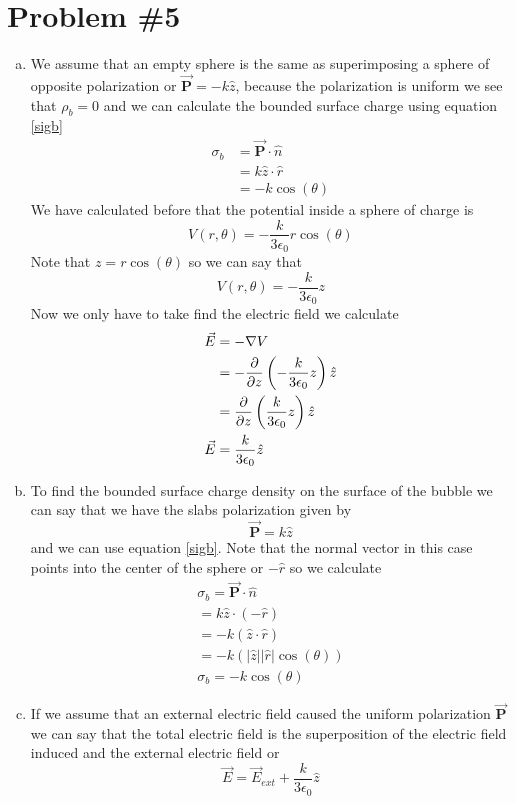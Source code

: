 \documentclass[11pt]{article}
\numberwithin{equation}{section}
\newcommand{\grad}{\bold\nabla}
\newcommand{\vecE}{\vec{E}}
\newcommand{\vecP}{\vec{\mathbf{P}}}
\begin{document}
\section{Problem \#5}
\begin{enumerate}[(a)]
\item
We assume that an empty sphere is the same as superimposing a sphere of opposite polarization or $\vecP = -k\hat{z}$, because the polarization is uniform we see that $\rho_b = 0$ and we can calculate the bounded surface charge using equation \ref{sigb}
\begin{align*}
\sigma_b &= \vecP \cdot\hat{n}\\
&=k\hat{z}\cdot\hat{r}\\
&=-k\cos(\theta)
\end{align*}
We have calculated before that the potential inside a sphere of charge is
$$V(r,\theta) = -\frac{k}{3\epsilon_0}r\cos(\theta)$$
Note that $z=r\cos(\theta)$ so we can say that
$$V(r,\theta) = -\frac{k}{3\epsilon_0}z$$
Now we only have to take find the electric field we calculate
\begin{align*}
\vecE &= -\grad V\\
&= -\frac{\partial}{\partial z}\left(-\frac{k}{3\epsilon_0}z\right)\hat{z} \\
&= \frac{\partial}{\partial z}\left(\frac{k}{3\epsilon_0}z\right)\hat{z} \\
\vecE &= \frac{k}{3\epsilon_0}\hat{z} 
\end{align*}

\item
To find the bounded surface charge density on the surface of the bubble we can say that we have the slabs polarization given by
$$\vecP = k\hat{z}$$
and we can use equation \ref{sigb}. Note that the normal vector in this case points into the center of the sphere or $-\hat{r}$ so we calculate
\begin{align*}
\sigma_b = \vecP\cdot\hat{n}\\
= k\hat{z}\cdot(-\hat{r})\\
= -k(\hat{z}\cdot\hat{r})\\
= -k(|\hat{z}||\hat{r}|\cos(\theta))\\
\sigma_b = -k\cos(\theta)
\end{align*}

\item
If we assume that an external electric field caused the uniform polarization $\vecP$ we can say that the total electric field is the superposition of the electric field induced and the external electric field or
$$\vecE = \vecE_{ext} + \frac{k}{3\epsilon_0}\hat{z}$$

\end{enumerate}
\end{document}
